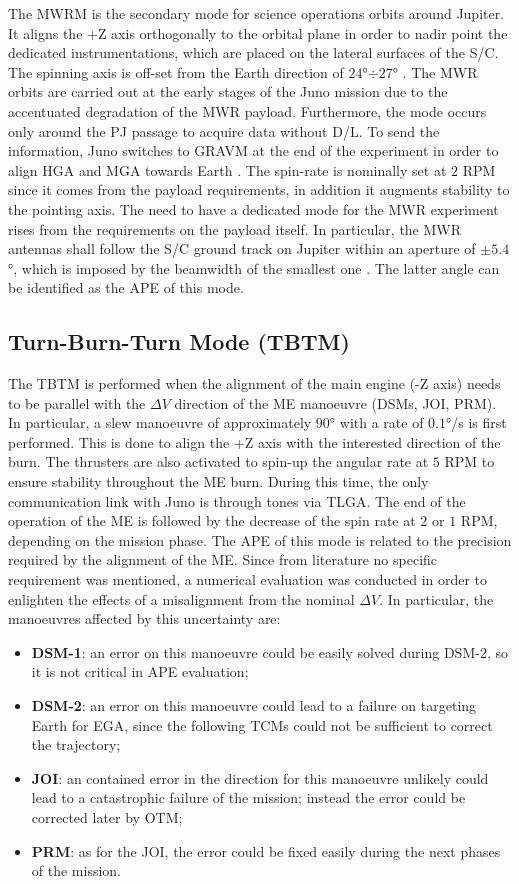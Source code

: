 The MWRM is the secondary mode for science operations orbits around Jupiter. It aligns the +Z axis orthogonally to the orbital plane in order to nadir point the dedicated instrumentations, which are placed on the lateral surfaces of the S/C. 
The spinning axis is off-set from the Earth direction of $24$°$\div$$27$° \cite{shadan}.
The MWR orbits are carried out at the early stages of the Juno mission due to the accentuated degradation of the MWR payload. Furthermore, the mode occurs only around the PJ passage to acquire data without D/L.
To send the information, Juno switches to GRAVM at the end of the experiment in order to align HGA and MGA towards Earth \cite{stuart}.
The spin-rate is nominally set at $2$ RPM since it comes from the payload requirements, in addition it augments stability to the pointing axis. 
The need to have a dedicated mode for the MWR experiment rises from the requirements on the payload itself. 
In particular, the MWR antennas shall follow the S/C ground track on Jupiter within an aperture of $\pm 5.4$°, which is imposed by the beamwidth of the smallest one \cite{mwr}.
The latter angle can be identified as the APE of this mode. 

\subsection{Turn-Burn-Turn Mode (TBTM)}
\label{subsec:tbt_mode}

The TBTM is performed when the alignment of the main engine (-Z axis) needs to be parallel with the $\Delta V$ direction of the ME manoeuvre (DSMs, JOI, PRM).
In particular, a slew manoeuvre of approximately $90$° with a rate of $0.1$°/s is first performed. This is done to align the +Z axis with the interested direction of the burn.
The thrusters are also activated to spin-up the angular rate at $5$ RPM to ensure stability throughout the ME burn. During this time, the only communication link with Juno is through tones via TLGA.
The end of the operation of the ME is followed by the decrease of the spin rate at $2$ or $1$ RPM, depending on the mission phase. The APE of this mode is related to the precision required by the alignment of the ME.
Since from literature no specific requirement was mentioned, a numerical evaluation was conducted in order to enlighten the effects of a misalignment from the nominal $\Delta V$.
In particular, the manoeuvres affected by this uncertainty are:
\begin{itemize}
    \item \textbf{DSM-1}: an error on this manoeuvre could be easily solved during DSM-2, so it is not critical in APE evaluation;
    \item \textbf{DSM-2}: an error on this manoeuvre could lead to a failure on targeting Earth for EGA, since the following TCMs could not be sufficient to correct the trajectory;
    \item \textbf{JOI}: an contained error in the direction for this manoeuvre unlikely could lead to a catastrophic failure of the mission; instead the error could be corrected later by OTM;
    \item \textbf{PRM}: as for the JOI, the error could be fixed easily during the next phases of the mission.
\end{itemize}

